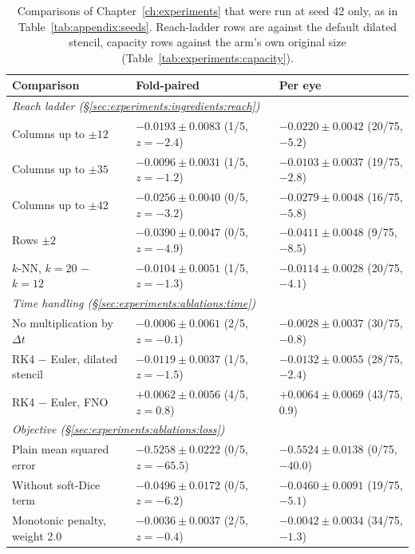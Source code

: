 \begin{table}[!h]
  \centering
  \caption[Comparisons at seed 42 only.]{%
    Comparisons of Chapter~\ref{ch:experiments} that were run at seed 42
    only, as in Table~\ref{tab:appendix:seeds}. Reach-ladder rows are
    against the default dilated stencil, capacity rows against the arm's
    own original size (Table~\ref{tab:experiments:capacity}).}
  \label{tab:appendix:seed42}
  \footnotesize
  \begin{tabular}{l l l}
    \toprule
    Comparison & Fold-paired & Per eye \\
    \midrule
    \multicolumn{3}{l}{\emph{Reach ladder (\S\ref{sec:experiments:ingredients:reach})}} \\
    Columns up to $\pm 12$ & $-0.0193 \pm 0.0083$ (1/5, $z = -2.4$) & $-0.0220 \pm 0.0042$ (20/75, $-5.2$) \\
    Columns up to $\pm 35$ & $-0.0096 \pm 0.0031$ (1/5, $z = -1.2$) & $-0.0103 \pm 0.0037$ (19/75, $-2.8$) \\
    Columns up to $\pm 42$ & $-0.0256 \pm 0.0040$ (0/5, $z = -3.2$) & $-0.0279 \pm 0.0048$ (16/75, $-5.8$) \\
    Rows $\pm 2$ & $-0.0390 \pm 0.0047$ (0/5, $z = -4.9$) & $-0.0411 \pm 0.0048$ (9/75, $-8.5$) \\
    $k$-NN, $k = 20$ $-$ $k = 12$ & $-0.0104 \pm 0.0051$ (1/5, $z = -1.3$) & $-0.0114 \pm 0.0028$ (20/75, $-4.1$) \\
    \midrule
    \multicolumn{3}{l}{\emph{Time handling (\S\ref{sec:experiments:ablations:time})}} \\
    No multiplication by $\Delta t$ & $-0.0006 \pm 0.0061$ (2/5, $z = -0.1$) & $-0.0028 \pm 0.0037$ (30/75, $-0.8$) \\
    RK4 $-$ Euler, dilated stencil & $-0.0119 \pm 0.0037$ (1/5, $z = -1.5$) & $-0.0132 \pm 0.0055$ (28/75, $-2.4$) \\
    RK4 $-$ Euler, FNO & $+0.0062 \pm 0.0056$ (4/5, $z = 0.8$) & $+0.0064 \pm 0.0069$ (43/75, 0.9) \\
    \midrule
    \multicolumn{3}{l}{\emph{Objective (\S\ref{sec:experiments:ablations:loss})}} \\
    Plain mean squared error & $-0.5258 \pm 0.0222$ (0/5, $z = -65.5$) & $-0.5524 \pm 0.0138$ (0/75, $-40.0$) \\
    Without soft-Dice term & $-0.0496 \pm 0.0172$ (0/5, $z = -6.2$) & $-0.0460 \pm 0.0091$ (19/75, $-5.1$) \\
    Monotonic penalty, weight 2.0 & $-0.0036 \pm 0.0037$ (2/5, $z = -0.4$) & $-0.0042 \pm 0.0034$ (34/75, $-1.3$) \\

\end{tabular}
\end{table}
